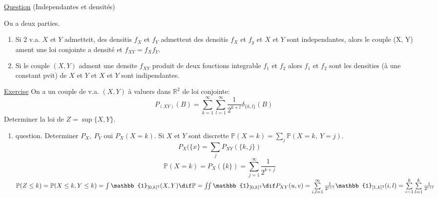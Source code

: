 \underline{Question} (Independantes et densités)
\begin{proposition}
	Ou a deux parties.
	\begin{enumerate}
		\item Si 2 v.a. $X$ et $Y$ admetteit, des densitis $f_X$ et $f_Y$ admetteut des densitis $f_X$ et $f_y$ et $X$ et $Y$ sont independantes, alors le couple (X, Y) ament une loi conjointe a densité et $f_{XY}=f_X f_Y$.
		\item Si le couple $(X, Y)$ adment une densite $f_{XY}$ produit de deux fouctions integrable $f_1$ et $f_2$ alors $f_1$ et $f_2$ sont les densities (à une constant pvit) de $X$ et $Y$ et $X$ et $Y$ sont indipendantes.
	\end{enumerate}
\end{proposition}

\underline{Exercise}
On a un couple de v.a. $(X, Y)$ à valuers dans $\mathbb{R}^2$ de loi conjointe:
$$P_{(XY)}(B)=\sum_{k=1}^\infty\sum_{l=1}^\infty \frac{1}{2^{k+l}}\delta_{\{k, l\}}(B)$$
Determiner la loi de $Z=\sup \{X, Y\}$.
\begin{enumerate}
	\item{question}. Determiner $P_X,\ P_Y$ oui $P_X(X=k)$.
Si $X$ et $Y$ sont discrette $\mathbb{P}(X=k)=\sum\limits_j\mathbb{P}(X=k,\ Y=j)$. $$P_X(\{x\}=\sum\limits_j P_{XY}(\{k, j\})$$
$$\mathbb{P}(X=k)=P_X(\{k\})=\sum\limits_{j=1}^\infty \frac{1}{2^{k+j}}$$
$\mathbb{P}(Z\leq k)=\mathbb{P}(X\leq k, Y\leq k)=\int \mathbb{1}_{[0, k]^2}(X, Y)\dif \mathbb{P}=\iint \mathbb{1}_{[0, k]^2} \dif P_{XY}(u, v)=\sum\limits_{i,l=1}^\infty \frac{1}{2^{i+l}}\mathbb{1}_{[1, k]^2}(i, l)=\sum\limits_{i=1}^k\sum\limits_{l=1}^k\frac{1}{2^{i+l}}$
\end{enumerate}
